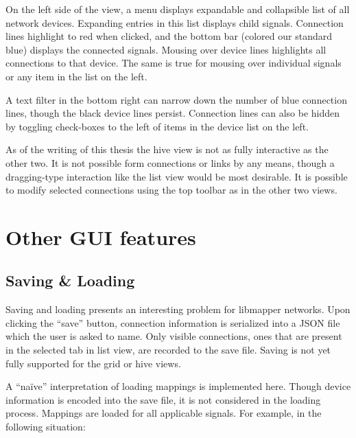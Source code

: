 On the left side of the view, a menu displays expandable and collapsible list of all network devices. Expanding entries in this list displays child signals. Connection lines highlight to red when clicked, and the bottom bar (colored our standard blue) displays the connected signals. Mousing over device lines highlights all connections to that device. The same is true for mousing over individual signals or any item in the list on the left.

A text filter in the bottom right can narrow down the number of blue connection lines, though the black device lines persist. Connection lines can also be hidden by toggling check-boxes to the left of items in the device list on the left.

As of the writing of this thesis the hive view is not as fully interactive as the other two. It is not possible form connections or links by any means, though a dragging-type interaction like the list view would be most desirable. It is possible to modify selected connections using the top toolbar as in the other two views.



\section{Other GUI features} %
\label{sec:other_gui_features}

	\subsection{Saving \& Loading} %
	\label{sec:saving_and_loading}

Saving and loading presents an interesting problem for libmapper networks.  Upon clicking the ``save'' button, connection information is serialized into a JSON file which the user is asked to name. Only visible connections, ones that are present in the selected tab in list view, are recorded to the save file. Saving is not yet fully supported for the grid or hive views.

A ``na\"{i}ve'' interpretation of loading mappings is implemented here. Though device information is encoded into the save file, it is not considered in the loading process. Mappings are loaded for all applicable signals. For example, in the following situation:

